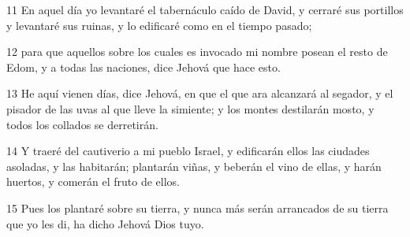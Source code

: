 \par 11 En aquel día yo levantaré el tabernáculo caído de David, y cerraré sus portillos y levantaré sus ruinas, y lo edificaré como en el tiempo pasado;
\par 12 para que aquellos sobre los cuales es invocado mi nombre posean el resto de Edom, y a todas las naciones, dice Jehová que hace esto. 
\par 13 He aquí vienen días, dice Jehová, en que el que ara alcanzará al segador, y el pisador de las uvas al que lleve la simiente; y los montes destilarán mosto, y todos los collados se derretirán.
\par 14 Y traeré del cautiverio a mi pueblo Israel, y edificarán ellos las ciudades asoladas, y las habitarán; plantarán viñas, y beberán el vino de ellas, y harán huertos, y comerán el fruto de ellos.
\par 15 Pues los plantaré sobre su tierra, y nunca más serán arrancados de su tierra que yo les di, ha dicho Jehová Dios tuyo.

